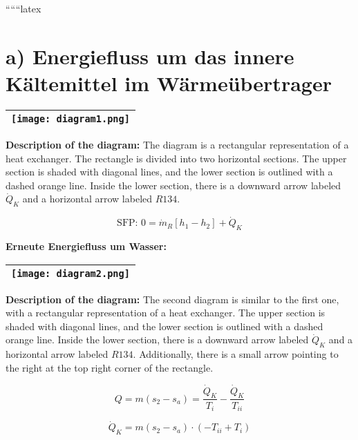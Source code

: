 ``````latex


\section*{a) Energiefluss um das innere Kältemittel im Wärmeübertrager}

\begin{center}
\begin{tabular}{|c|}
\hline
\begin{minipage}{0.9\textwidth}
\centering
\texttt{[image: diagram1.png]}
\end{minipage} \\
\hline
\end{tabular}
\end{center}

\textbf{Description of the diagram:} The diagram is a rectangular representation of a heat exchanger. The rectangle is divided into two horizontal sections. The upper section is shaded with diagonal lines, and the lower section is outlined with a dashed orange line. Inside the lower section, there is a downward arrow labeled \( \dot{Q}_K \) and a horizontal arrow labeled \( R134 \).

\[
\text{SFP: } 0 = \dot{m}_R [h_1 - h_2] + \dot{Q}_K
\]

\textbf{Erneute Energiefluss um Wasser:}

\begin{center}
\begin{tabular}{|c|}
\hline
\begin{minipage}{0.9\textwidth}
\centering
\texttt{[image: diagram2.png]}
\end{minipage} \\
\hline
\end{tabular}
\end{center}

\textbf{Description of the diagram:} The second diagram is similar to the first one, with a rectangular representation of a heat exchanger. The upper section is shaded with diagonal lines, and the lower section is outlined with a dashed orange line. Inside the lower section, there is a downward arrow labeled \( \dot{Q}_K \) and a horizontal arrow labeled \( R134 \). Additionally, there is a small arrow pointing to the right at the top right corner of the rectangle.

\[
Q = m (s_{2} - s_{a}) = \frac{\dot{Q}_K}{T_i} - \frac{\dot{Q}_K}{T_{ii}}
\]

\[
\dot{Q}_K = m (s_{2} - s_{a}) \cdot (-T_{ii} + T_{i})
\]

